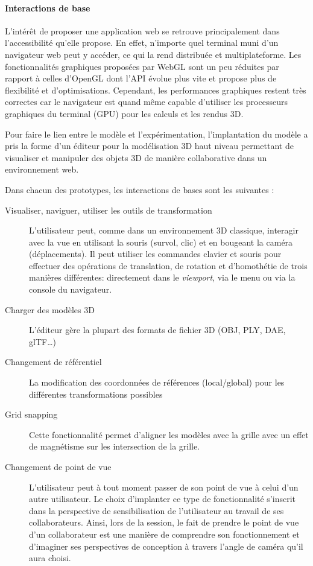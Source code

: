 \paragraph{Interactions de base}
L'intérêt de proposer une application web se retrouve principalement dans 
l'accessibilité qu'elle propose. 
En effet, n'importe quel terminal muni d'un navigateur web peut y accéder, ce qui 
la rend distribuée et multiplateforme. 
Les fonctionnalités graphiques proposées par WebGL sont un peu réduites par 
rapport à celles d'OpenGL dont l'\gls{API} évolue plus vite et propose plus de 
flexibilité et d'optimisations. Cependant, les performances graphiques restent très 
correctes car le navigateur est quand même capable d'utiliser les processeurs 
graphiques du terminal (GPU) pour les calculs et les rendus \gls{3D}.

Pour faire le lien entre le modèle et l'expérimentation, l'implantation du modèle a 
pris la forme d'un éditeur pour la modélisation \gls{3D} haut niveau permettant de 
visualiser et manipuler des objets \gls{3D} de manière collaborative dans un 
environnement web.

Dans chacun des prototypes, les interactions de bases sont les suivantes :
\begin{description}
	
	\item[Visualiser, naviguer, utiliser les outils de transformation] L'utilisateur peut, 
	com\-me dans un environnement \gls{3D} classique, interagir avec la vue en 
	utilisant 
	la souris (survol, clic) et en bougeant la caméra (déplacements). Il peut 
	utiliser les commandes clavier et souris pour effectuer des opérations de 
	translation, de rotation et d'homothétie de trois manières différentes: 
	directement dans le \textit{viewport}, via le 
	menu ou via la console du navigateur.
	\item[Charger des modèles \gls{3D}] L'éditeur gère la plupart des formats de 
	fichier 
	3D (OBJ, PLY, DAE, glTF\ldots)
	\item[Changement de référentiel] La modification des coordonnées de 
	réfé\-ren\-ces (local/global)  pour les différentes transformations possibles
	\item[Grid snapping] Cette fonctionnalité permet d'aligner les modèles avec la 
	grille avec un effet de magnétisme sur les intersection de la grille.
	\item[Changement de point de vue] L'utilisateur peut à tout moment passer de 
	son point de vue à celui d'un autre utilisateur. Le choix d'implanter ce type de 
	fonctionnalité s'inscrit dans la perspective de sensibilisation de l'utilisateur au 
	travail de ses collaborateurs. Ainsi, lors de la session, le fait de prendre le 
	point de vue d'un collaborateur est une manière de 
	comprendre son fonctionnement et d'imaginer ses 
	perspectives de conception à travers l'angle de caméra qu'il aura choisi.
\end{description}

